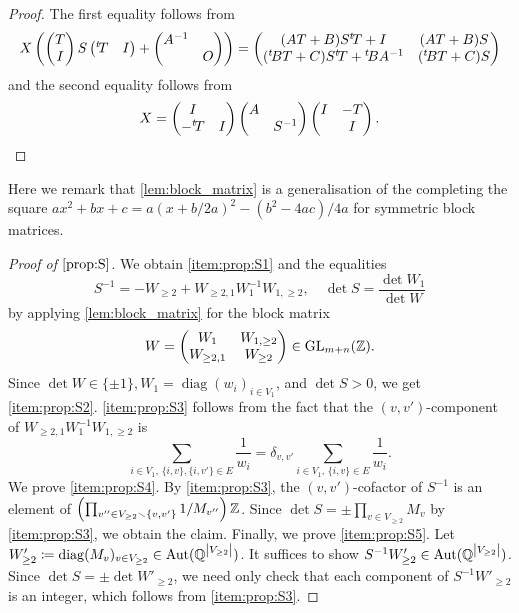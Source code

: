 \documentclass[11pt,a4paper,lualatex]{amsart}
\DeclareMathOperator{\diag}{diag}
\numberwithin{equation}{section} %
\begin{document}
\begin{proof}
	The first equality follows from
	\[
	X \left( \begin{pmatrix}T \\ I\end{pmatrix} S \begin{pmatrix}{}^t\!T & I\end{pmatrix} + \begin{pmatrix}A^{-1} & \\ & O\end{pmatrix} \right) 
	= \begin{pmatrix} (AT+B) S {}^t\!T + I & (AT+B)S \\ ({}^t\!B T + C)S{}^t\!T + {}^t\!B A^{-1} & ({}^t\!B T + C)S \end{pmatrix}
	\]
	and the second equality follows from
	\[
	X = \begin{pmatrix} I &  \\  -{}^t\!T & I\end{pmatrix} \begin{pmatrix}A & \\ &S^{-1}\end{pmatrix} \begin{pmatrix}I & -T \\ & I\end{pmatrix}.
	\]
\end{proof}

Here we remark that \cref{lem:block_matrix} is a generalisation of the completing the square $ ax^2 + bx + c = a(x + b/2a)^2 - (b^2 - 4ac)/4a $ for symmetric block matrices.

\begin{proof}[Proof of $ \cref{prop:S} $]
	We obtain \cref{item:prop:S1} and the equalities
	\[
	S^{-1} = -W_{\ge 2} + W_{\ge 2, 1} W_1^{-1} W_{1, \ge 2}, \quad
	\det S = \frac{\det W_1}{\det W}
	\]
	by applying \cref{lem:block_matrix} for the block matrix
	\[
	W = \begin{pmatrix}W_1 & W_{1, \ge 2} \\ W_{\ge 2, 1} & W_{\ge 2}\end{pmatrix} \in \operatorname{GL}_{m+n} (\mathbb{Z}).
	\]
	Since $ \det W \in \{ \pm 1 \}, W_1 = \diag(w_i)_{i \in V_1} $, and $ \det S > 0 $, we get \cref{item:prop:S2}. 
	\cref{item:prop:S3} follows from the fact that the $ (v, v') $-component of $ W_{\ge 2, 1} W_1^{-1} W_{1, \ge 2} $ is
	\[
	\sum_{i \in V_1, \, \{ i, v \}, \{ i, v' \} \in E} \frac{1}{w_i} = \delta_{v, v'} \sum_{i \in V_1, \, \{ i, v \} \in E} \frac{1}{w_i}.
	\]
	We prove \cref{item:prop:S4}. 
	By \cref{item:prop:S3}, the $ (v, v') $-cofactor of $ S^{-1} $ is an element of
	$ \left( \prod_{v^{\prime \prime} \in V_{\ge 2} \smallsetminus \{ v, v' \}} 1/M_{v^{\prime \prime}} \right) \mathbb{Z} $.
	Since $ \det S =  \pm \prod_{v \in V_{\ge 2}} M_v $ by \cref{item:prop:S3}, we obtain the claim.
	Finally, we prove \cref{item:prop:S5}.
	Let $ W'_{\ge 2} \coloneqq \diag(M_v)_{v \in V_{\ge 2}} \in \Aut(\Q^{\abs{V_{\ge 2}}}) $.
	It suffices to show $ S^{-1} W'_{\ge 2} \in \operatorname{Aut}(\mathbb{Q}^{\left\lvert V_{\ge 2}\right\rvert}) $. 
	Since $ \det S = \pm \det W'_{\ge 2} $, we need only check that each component of $ S^{-1} W'_{\ge 2} $ is an integer, which follows from \cref{item:prop:S3}. 
\end{proof}

\end{document}

